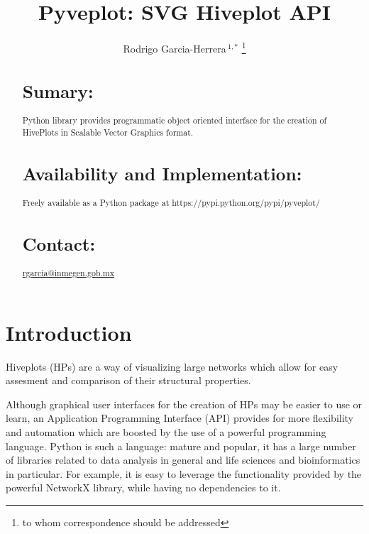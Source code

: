 \documentclass{bioinfo}
\begin{document}

\title[short Title]{Pyveplot: SVG Hiveplot API}
\author[Sample \textit{et~al}]{Rodrigo Garcia-Herrera\,$^{1,*}$ \footnote{to whom correspondence should be addressed}}
\address{$^{1}$Department of Bioinformatics, Mexican Institute of
  Genomic Medicine}



\maketitle

\begin{abstract}

\section{Sumary:}
Python library provides programmatic object oriented interface for the creation of
HivePlots in Scalable Vector Graphics format.
\section{Availability and Implementation:}
Freely available as a Python package at
https://pypi.python.org/pypi/pyveplot/

\section{Contact:} \href{rgarcia@inmegen.gob.mx}{rgarcia@inmegen.gob.mx}
\end{abstract}

\section{Introduction}

Hiveplots (HPs) are a way of visualizing large networks which allow
for easy assesment and comparison of their structural properties.
\cite{krzywinski2012hive}

Although graphical user interfaces for the creation of HPs may be
easier to use or learn, an Application Programming Interface
(API) provides for more flexibility and automation which are boosted
by the use of a powerful programming language. Python is such a
language: mature and popular, it has a large number of libraries
related to data analysis in general and life sciences and
bioinformatics in particular. For example, it is easy to leverage the
functionality provided by the powerful NetworkX library, while having
no dependencies to it.
\end{document}
